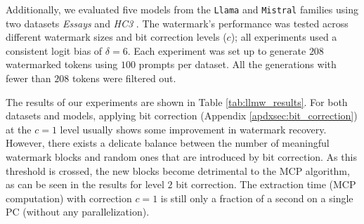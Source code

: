 \documentclass[a4paper,11pt]{llncs}
\begin{document}
Additionally, we evaluated five models from the \texttt{Llama} and \texttt{Mistral} families using two datasets \textit{Essays} \cite{Schuhmann2023EssaysWithInstructions} and \textit{HC3} \cite{guo-etal-2023-hc3}. The watermark's performance was tested across different watermark sizes and bit correction levels ($c$); all experiments used a consistent logit bias of $\delta=6$. Each experiment was set up to generate $208$ watermarked tokens using $100$ prompts per dataset. All the generations with fewer than $208$ tokens were filtered out.

The results of our experiments are shown in Table \ref{tab:llmw_results}. For both datasets and models, applying bit correction (Appendix \ref{apdxsec:bit_correction}) at the $c=1$ level usually shows some improvement in watermark recovery. However, there exists a delicate balance between the number of meaningful watermark blocks and random ones that are introduced by bit correction. As this threshold is crossed, the new blocks become detrimental to the MCP algorithm, as can be seen in the results for level $2$ bit correction.
The extraction time (MCP computation) with correction $c=1$ is still only a fraction of a second on a single PC (without any parallelization). 
%
\end{document}
